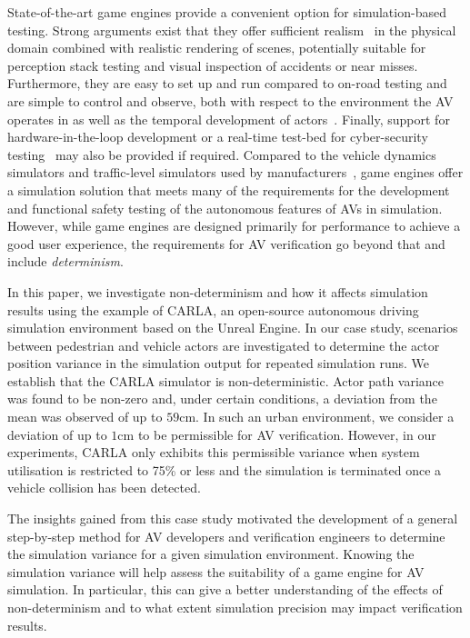 State-of-the-art game engines provide a convenient option for simulation-based testing. Strong arguments exist that they offer sufficient realism~\cite{Koopman2018} in the physical domain combined with realistic rendering of scenes, potentially suitable for perception stack testing and visual inspection of accidents or near misses. 
%
Furthermore, they are easy to set up and run compared to on-road testing and are simple to control and observe, both with respect to the environment the AV operates in as well as the temporal development of actors~\cite{Ulbrich2015}. 
%
Finally, support for hardware-in-the-loop development or a real-time test-bed for cyber-security testing~\cite{Javaid2013} may also be provided if required. 
%
Compared to the vehicle dynamics simulators and traffic-level simulators used by manufacturers~\cite{FrameworkAndChallenges}, game engines offer a simulation solution that meets many of the requirements for the development and functional safety testing of the autonomous features of AVs in simulation. 
%
However, while game engines are designed primarily for performance to achieve a good user experience, the requirements for AV verification go beyond that and include \textit{determinism}.

In this paper, we investigate non-determinism and how it affects simulation results using the example of CARLA, an open-source autonomous driving simulation environment based on the Unreal Engine.
%
In our case study, scenarios between pedestrian and vehicle actors are investigated to determine the actor position variance in the simulation output for repeated simulation runs. 
%
We establish that the CARLA simulator is non-deterministic.  Actor path variance was found to be non-zero and, under certain conditions, a deviation from the mean was observed of up to $59$cm.
%
In such an urban environment, we consider a deviation of up to $1$cm to be permissible for AV verification.
%
However, in our experiments, CARLA only exhibits this permissible variance when system utilisation is restricted to 75\% or less and the simulation is terminated once a vehicle collision has been detected.

The insights gained from this case study motivated the development of a general step-by-step method for AV developers and verification engineers to determine the simulation variance for a given simulation environment. 
%
Knowing the simulation variance will help assess the suitability of a game engine for AV simulation. In particular, this can give a better understanding of the effects of non-determinism and to what extent simulation precision may impact verification results.
%

